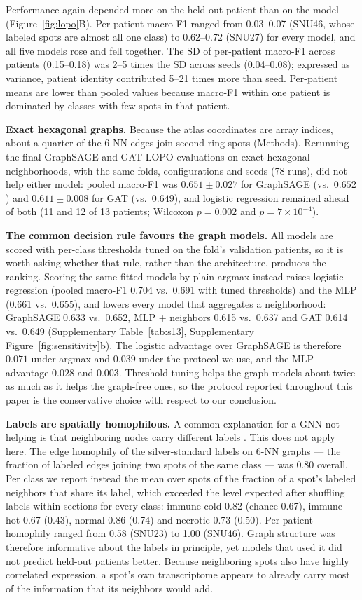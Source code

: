 \documentclass[11pt,letterpaper]{article}
\begin{document}
Performance again depended more on the held-out patient than on the model (Figure~\ref{fig:lopo}B). Per-patient macro-F1 ranged from 0.03--0.07 (SNU46, whose labeled spots are almost all one class) to 0.62--0.72 (SNU27) for every model, and all five models rose and fell together. The SD of per-patient macro-F1 across patients (0.15--0.18) was 2--5 times the SD across seeds (0.04--0.08); expressed as variance, patient identity contributed 5--21 times more than seed. Per-patient means are lower than pooled values because macro-F1 within one patient is dominated by classes with few spots in that patient.

\textbf{Exact hexagonal graphs.} Because the atlas coordinates are array indices, about a quarter of the 6-NN edges join second-ring spots (Methods). Rerunning the final GraphSAGE and GAT LOPO evaluations on exact hexagonal neighborhoods, with the same folds, configurations and seeds (78 runs), did not help either model: pooled macro-F1 was $0.651 \pm 0.027$ for GraphSAGE (vs.\ $0.652$) and $0.611 \pm 0.008$ for GAT (vs.\ $0.649$), and logistic regression remained ahead of both (11 and 12 of 13 patients; Wilcoxon $p = 0.002$ and $p = 7 \times 10^{-4}$).

\textbf{The common decision rule favours the graph models.} All models are scored with per-class thresholds tuned on the fold's validation patients, so it is worth asking whether that rule, rather than the architecture, produces the ranking. Scoring the same fitted models by plain argmax instead raises logistic regression (pooled macro-F1 0.704 vs.\ 0.691 with tuned thresholds) and the MLP (0.661 vs.\ 0.655), and lowers every model that aggregates a neighborhood: GraphSAGE 0.633 vs.\ 0.652, MLP + neighbors 0.615 vs.\ 0.637 and GAT 0.614 vs.\ 0.649 (Supplementary Table~\ref{tab:s13}, Supplementary Figure~\ref{fig:sensitivity}b). The logistic advantage over GraphSAGE is therefore $0.071$ under argmax and $0.039$ under the protocol we use, and the MLP advantage $0.028$ and $0.003$. Threshold tuning helps the graph models about twice as much as it helps the graph-free ones, so the protocol reported throughout this paper is the conservative choice with respect to our conclusion.

\textbf{Labels are spatially homophilous.} A common explanation for a GNN not helping is that neighboring nodes carry different labels \cite{zhu2020homophily}. This does not apply here. The edge homophily of the silver-standard labels on 6-NN graphs --- the fraction of labeled edges joining two spots of the same class --- was 0.80 overall. Per class we report instead the mean over spots of the fraction of a spot's labeled neighbors that share its label, which exceeded the level expected after shuffling labels within sections for every class: immune-cold 0.82 (chance 0.67), immune-hot 0.67 (0.43), normal 0.86 (0.74) and necrotic 0.73 (0.50). Per-patient homophily ranged from 0.58 (SNU23) to 1.00 (SNU46). Graph structure was therefore informative about the labels in principle, yet models that used it did not predict held-out patients better. Because neighboring spots also have highly correlated expression, a spot's own transcriptome appears to already carry most of the information that its neighbors would add.
\end{document}
